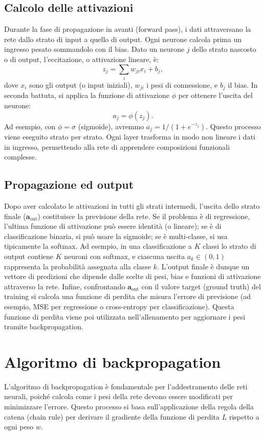 \documentclass[a4paper,12pt]{report}
\begin{document}
	\subsection{Calcolo delle attivazioni}
	Durante la fase di propagazione in avanti (forward pass), i dati attraversano la rete dallo strato di input a quello di output. Ogni neurone calcola prima un ingresso pesato sommandolo con il bias. Dato un neurone $j$ dello strato nascosto o di output, l'eccitazione, o attivazione lineare, è:
	\[
	z_j = \sum_i w_{ji} x_i + b_j,
	\]
	dove $x_i$ sono gli output (o input iniziali), $w_{ji}$ i pesi di connessione, e $b_j$ il bias. In seconda battuta, si applica la funzione di attivazione $\phi$ per ottenere l'uscita del neurone:
	\[
	a_j = \phi(z_j).
	\]
	Ad esempio, con $\phi=\sigma$ (sigmoide), avremmo $a_j=1/(1+e^{-z_j})$. Questo processo viene eseguito strato per strato. Ogni layer trasforma in modo non lineare i dati in ingresso, permettendo alla rete di apprendere composizioni funzionali complesse.
	
	\subsection{Propagazione ed output}
	Dopo aver calcolato le attivazioni in tutti gli strati intermedi, l'uscita dello strato finale ($\mathbf{a}_{\text{out}}$) costituisce la previsione della rete. Se il problema è di regressione, l'ultima funzione di attivazione può essere identità (o lineare); se è di classificazione binaria, si può usare la sigmoide; se è multi-classe, si usa tipicamente la softmax. Ad esempio, in una classificazione a $K$ classi lo strato di output contiene $K$ neuroni con softmax, e ciascuna uscita $a_k \in (0,1)$ rappresenta la probabilità assegnata alla classe $k$. L'output finale è dunque un vettore di predizioni che dipende dalle scelte di pesi, bias e funzioni di attivazione attraverso la rete. Infine, confrontando $\mathbf{a}_{\text{out}}$ con il valore target (ground truth) del training si calcola una funzione di perdita che misura l'errore di previsione (ad esempio, MSE per regressione o cross-entropy per classificazione). Questa funzione di perdita viene poi utilizzata nell'allenamento per aggiornare i pesi tramite backpropagation.
	
	\section{Algoritmo di backpropagation}
	L'algoritmo di backpropagation è fondamentale per l'addestramento delle reti neurali, poiché calcola come i pesi della rete devono essere modificati per minimizzare l'errore. Questo processo si basa sull'applicazione della regola della catena (chain rule) per derivare il gradiente della funzione di perdita $L$ rispetto a ogni peso $w$.
	
\end{document}
